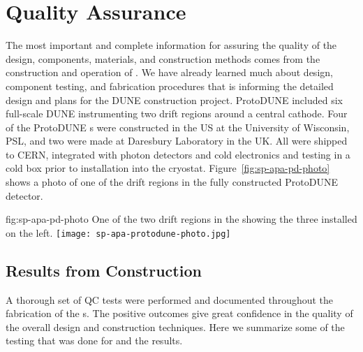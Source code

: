 \section{Quality Assurance}
\label{sec:fdsp-apa-qa}



The most important and complete information for assuring the quality of the  design, components, materials, and construction methods comes from the construction and operation of .  We have already learned much about design, component testing, and fabrication procedures that is informing the detailed design and plans for the DUNE  construction project. ProtoDUNE included six full-scale DUNE  instrumenting two drift regions around a central cathode.  Four of the ProtoDUNE s were constructed in the US at the University of Wisconsin, PSL, and two were made at Daresbury Laboratory in the UK. All were shipped to CERN, integrated with photon detectors and cold electronics and testing in a cold box prior to installation into the  cryostat.  Figure~\ref{fig:sp-apa-pd-photo} shows a photo of one of the drift regions in the fully constructed ProtoDUNE detector.

\begin{dunefigure}{fig:sp-apa-pd-photo}
{One of the two drift regions in the  showing the three installed  on the left.}
\texttt{[image: sp-apa-protodune-photo.jpg]}
\end{dunefigure}

\subsection{Results from  Construction}
\label{sec:fdsp-apa-qa-protodune-const}

A thorough set of QC tests were performed and documented throughout the fabrication of the  s.  The positive outcomes give great confidence in the quality of the overall  design  and construction techniques.  Here we summarize some of the testing that was done for  and the results.   

